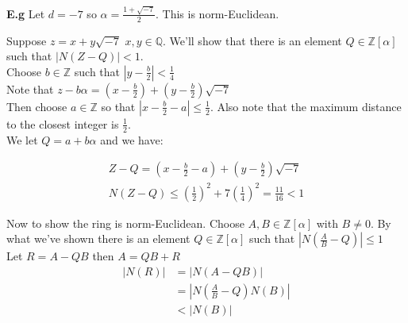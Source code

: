 \documentclass[11pt]{article}
\begin{document}
\newpage
\textbf{E.g} Let $d = -7$ so $\alpha = \frac{1+\sqrt{-7}}{2}$. This is norm-Euclidean.


Suppose $z= x+y \sqrt{-7} $ \hspace{7pt} $x,y \in \mathbb{Q}$. We'll show that there is an element $Q \in \mathbb{Z}[\alpha] $ such that $|N(Z-Q)| <1$.\\[1em]


Choose $b \in \mathbb{Z}$ such that $|y - \frac{b}{2}| < \frac{1}{4}$\\[1em]

Note that $z - b\alpha = (x-\frac{b}{2}) + (y-\frac{b}{2})\sqrt{-7}$\\[1em]

Then choose $a \in \mathbb{Z} $ so that $|x-\frac{b}{2} - a| \leq \frac{1}{2}$. Also note that the maximum distance to the closest integer is $\frac{1}{2}$.\\[1em]

We let $Q= a + b\alpha$ and we have:

\begin{align*}
	Z-Q = (x-\frac{b}{2} - a) + (y-\frac{b}{2}) \sqrt{-7}\\[2em]
	N(Z-Q) \leq (\frac{1}{2})^2 + 7(\frac{1}{4}) ^2 = \frac{11}{16} < 1
\end{align*}

Now to show the ring is norm-Euclidean. Choose $A, B \in \mathbb{Z}[\alpha]$ with $B \neq 0$. By what we've shown there is an element $Q \in \mathbb{Z}[\alpha]$ such that $|N(\frac{A}{B} -Q)| \leq 1$\\[1em]

Let $R = A-QB $ then $A=QB + R$
\begin{align*}
	|N(R)| &= |N(A-QB)|\\
	&= |N(\frac{A}{B} - Q ) N(B) |\\
	&< |N(B)|
\end{align*}






	
	
	
	











	
	
	
	
	

	
	
	
	
	
	
\end{document}
